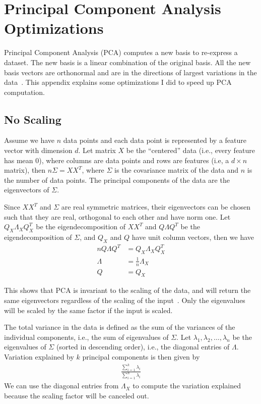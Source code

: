 \chapter{Principal Component Analysis Optimizations}\label{app:pca}
Principal Component Analysis (PCA) computes a new basis to re-express a 
dataset.
The new basis is a linear combination of the original basis. All the new basis vectors are orthonormal
and are in the directions of largest variations in the data~\cite{shlens2005}.
This appendix explains some optimizations I did to speed up PCA computation.

\section{No Scaling}

Assume we have $n$ data points and each data point is represented by a feature
vector with dimension $d$. Let matrix $X$ be the ``centered'' data (i.e., every
feature has mean 0), where columns are data points and rows are features (i.e,
a $d\times n$ matrix), then $n\Sigma = XX^T$, where $\Sigma$ is the covariance
matrix of the data and $n$ is the number of data points. The principal components of the data are the eigenvectors of
$\Sigma$.

Since $XX^T$ and $\Sigma$ are real symmetric matrices, their eigenvectors can be
chosen such that they are real, orthogonal to each other and have norm one. Let
$Q_X\Lambda_X Q_X^T$ be the  eigendecomposition of $XX^T$ and $Q\Lambda Q^T$ be
the eigendecomposition of $\Sigma$, and $Q_X$ and $Q$ have unit column
vectors, then we have
\begin{align*}
nQ\Lambda Q^T &= Q_X\Lambda_X Q_X^T  \\
\Lambda &= \frac{1}{n}\Lambda_X \\
Q &= Q_X
\end{align*}

This shows that PCA is invariant to the scaling of the data, and will return the
same eigenvectors regardless of the scaling of the input~\cite{pca14}. Only the
eigenvalues will be scaled by the same factor if the input is scaled. 

The total variance in the data is defined as the sum of the variances
of the individual components, i.e., the sum of eigenvalues of $\Sigma$. Let
$\lambda_1, \lambda_2, \ldots, \lambda_n$ be the eigenvalues of $\Sigma$
(sorted in descending order), i.e., the diagonal entries of $\Lambda$. Variation
explained by $k$ principal components is then given by
\begin{align}
\frac{\sum_{i=1}^{k} \lambda_i}{\sum_{i=1}^{n}\lambda_i}
\end{align}
We can use the diagonal entries from $\Lambda_X$ to compute the variation
explained because the scaling factor will be canceled out.

